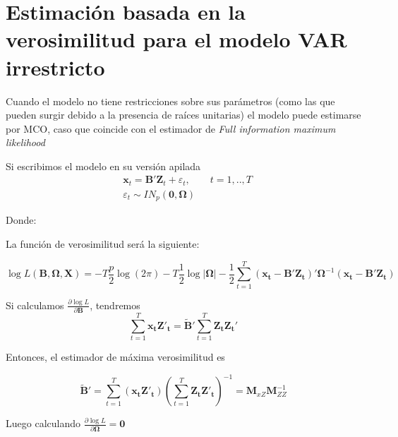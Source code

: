 \documentclass[12pt, twoside]{book}\usepackage[]{graphicx}\usepackage[]{color}
\let\bold\boldsymbol
\numberwithin{equation}{section}
\numberwithin{theorem}{section}
\numberwithin{teorema}{section}
\numberwithin{defi}{section}
\numberwithin{prop}{section}
\numberwithin{defi}{section}
\theoremstyle{plain}
\begin{document}
{\section{Estimación basada en la verosimilitud para el modelo VAR irrestricto}

Cuando el modelo no tiene restricciones sobre sus parámetros (como las que pueden surgir debido a la presencia de raíces unitarias) el modelo puede estimarse por MCO, caso que coincide con el estimador de \textit{Full information maximum likelihood}

Si escribimos el modelo en su versión apilada
\begin{align}
& \bold{x}_{t} = \bold{B'Z}_{t}+\varepsilon_{t}, \qquad t=1,..,T \\ 
& \varepsilon_{t}\sim IN_{p}(\bold{0,\Omega})
\end{align}

Donde: 

La función de verosimilitud será la siguiente: 

\begin{equation}
\log L(\boldsymbol{B,\Omega,X}) = -T\frac{p}{2}\log(2\pi)-T\frac{1}{2}\log|\bold{\Omega}|-\frac{1}{2}\sum_{t=1}^{T}(\bold{x_{t}-B'Z_{t}})'\boldsymbol{\Omega}^{-1}(\bold{x_{t}-B'Z_{t}})
\end{equation}

Si calculamos $\frac{\partial \log L}{\partial \bold{B}}$, tendremos
\begin{equation*}
\sum_{t=1}^{T}\bold{x_{t}Z'_{t}} = \bold{\tilde{B}'}\sum_{t=1}^{T}\bold{Z_{t}Z_{t}'}
\end{equation*}

Entonces, el estimador de máxima verosimilitud es 

\begin{equation}
\bold{\tilde{B}}' = \sum_{t=1}^{T}(\bold{x_{t}Z'_{t}})\left(\sum_{t=1}^{T}\bold{Z_{t}Z'_{t}}\right)^{-1} = \bold{M}_{xZ}\bold{M}_{ZZ}^{-1}
\end{equation}

Luego calculando $=\bold{0}$
}
\end{document}
